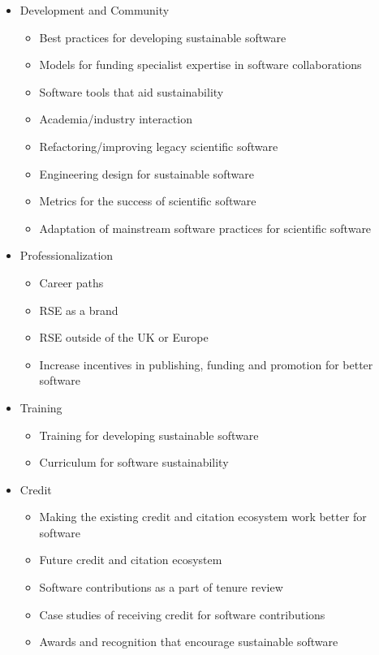 \documentclass[11pt, oneside]{amsart}
\begin{document}
%
\begin{itemize}
\renewcommand{\labelenumi}{\textbf{\theenumi}.}
\setlength{\rightmargin}{1em}

\item Development and Community
\begin{itemize}
    \item Best practices for developing sustainable software
    \item Models for funding specialist expertise in software collaborations
    \item Software tools that aid sustainability
    \item Academia/industry interaction
    \item Refactoring/improving legacy scientific software
    \item Engineering design for sustainable software
    \item Metrics for the success of scientific software
    \item Adaptation of mainstream software practices for scientific software
\end{itemize}

\item Professionalization
\begin{itemize}
    \item Career paths
    \item RSE as a brand
    \item RSE outside of the UK or Europe
    \item Increase incentives in publishing, funding and promotion for better software
\end{itemize}

\item Training
\begin{itemize}
    \item Training for developing sustainable software
    \item Curriculum for software sustainability
\end{itemize}

\item Credit
\begin{itemize}
    \item Making the existing credit and citation ecosystem work better for software
    \item Future credit and citation ecosystem
    \item Software contributions as a part of tenure review
    \item Case studies of receiving credit for software contributions
    \item Awards and recognition that encourage sustainable software
\end{itemize}


\end{itemize}
\end{document}
